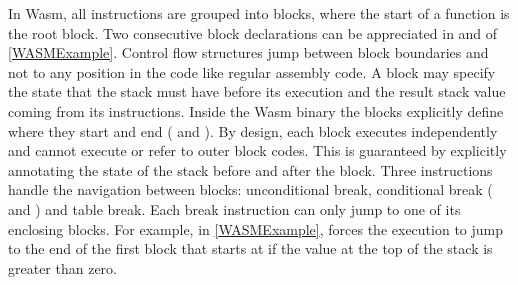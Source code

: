 In Wasm, all instructions are grouped into blocks, where the start of a function is the root block. Two consecutive block declarations can be appreciated in  and  of \autoref{WASMExample}. Control flow structures jump between block boundaries and not to any position in the code like regular assembly code. A block may specify the state that the stack must have before its execution and the result stack value coming from its instructions. Inside the Wasm  binary the blocks explicitly define where they start and end ( and ). By design, each block executes independently and cannot execute or refer to outer block codes. This is guaranteed by explicitly annotating the state of the stack before and after the block. Three instructions handle the navigation between blocks: unconditional break, conditional break ( and ) and table break. Each break instruction can only jump to one of its enclosing blocks. For example, in \autoref{WASMExample},  forces the execution to jump to the end of the first block that starts at  if the value at the top of the stack is greater than zero.


\label{background:wasm:memory}
\label{background:wasm:execution}

